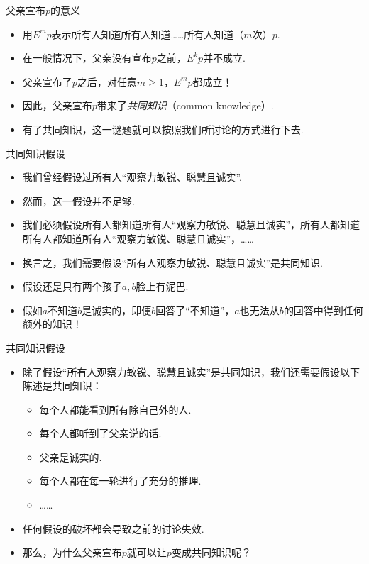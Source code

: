 {父亲宣布$p$的意义}
\begin{itemize}
    \item 用$E^m p$表示所有人知道所有人知道……所有人知道（$m$次）$p$.
    \item 在一般情况下，父亲没有宣布$p$之前，$E^k p$并不成立.
    \item 父亲宣布了$p$之后，对任意$m\geq 1$，$E^m p$都成立！
    \item 因此，父亲宣布$p$带来了\emph{共同知识}（common knowledge）.
    \item 有了共同知识，这一谜题就可以按照我们所讨论的方式进行下去.
\end{itemize}


{共同知识假设}
\begin{itemize}
    \item 我们曾经假设过所有人“观察力敏锐、聪慧且诚实”.
    \item 然而，这一假设并不足够.
    \item 我们必须假设所有人都知道所有人“观察力敏锐、聪慧且诚实”，所有人都知道所有人都知道所有人“观察力敏锐、聪慧且诚实”，……
    \item 换言之，我们需要假设“所有人观察力敏锐、聪慧且诚实”是共同知识.
    \item 假设还是只有两个孩子$a,b$脸上有泥巴.
    \item 假如$a$不知道$b$是诚实的，即便$b$回答了“不知道”，$a$也无法从$b$的回答中得到任何额外的知识！
\end{itemize}


{共同知识假设}
\begin{itemize}
    \item 除了假设“所有人观察力敏锐、聪慧且诚实”是共同知识，我们还需要假设以下陈述是共同知识：
    \begin{itemize}
        \item 每个人都能看到所有除自己外的人.
        \item 每个人都听到了父亲说的话.
        \item 父亲是诚实的.
        \item 每个人都在每一轮进行了充分的推理.
        \item ……
    \end{itemize}
    \item 任何假设的破坏都会导致之前的讨论失效.
    \item 那么，为什么父亲宣布$p$就可以让$p$变成共同知识呢？
\end{itemize}


